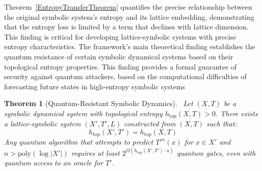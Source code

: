 \documentclass[12pt,a4paper]{article}
\newtheorem{theorem}{Theorem}[section]
\begin{document}
Theorem~\ref{EntropyTransferTheorem} quantifies the precise relationship between the original symbolic system's entropy and its lattice embedding, demonstrating that the entropy loss is limited by a term that declines with lattice dimension. This finding is critical for developing lattice-symbolic systems with precise entropy characteristics.
The framework's main theoretical finding establishes the quantum resistance of certain symbolic dynamical systems based on their topological entropy properties. This finding provides a formal guarantee of security against quantum attackers, based on the computational difficulties of forecasting future states in high-entropy symbolic systems

\begin{theorem}[Quantum-Resistant Symbolic Dynamics]~\label{QuantumResistantSymbolicDynamics}
Let $(X, T)$ be a symbolic dynamical system with topological entropy $h_{\text{top}}(X,T) > 0$. There exists a lattice-symbolic system $(X', T', L)$ constructed from $(X, T)$ such that:
\begin{equation}~\label{eq1QuantumResistantSymbolicDynamics}
h_{\text{top}}(X',T') = h_{\text{top}}(X,T)
\end{equation}
 Any quantum algorithm that attempts to predict $T'^n(x)$ for $x \in X'$ and $n > \text{poly}(\log|X'|)$ requires at least $2^{\Omega(h_{\text{top}}(X',T') \cdot n)}$ quantum gates, even with quantum access to an oracle for $T'$.
\end{theorem}
\end{document}
